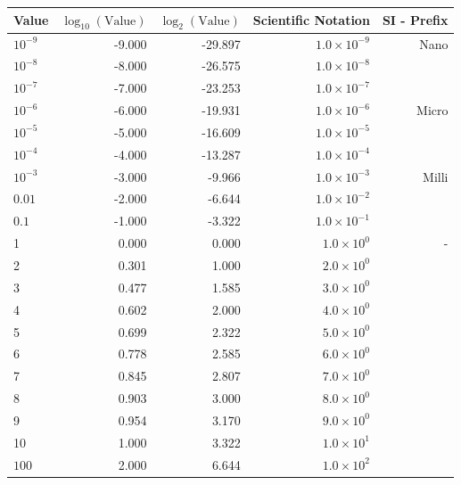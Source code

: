 \documentclass[12pt]{article}
\begin{document}
\begin{table}[h]
    \centering
    \renewcommand{\arraystretch}{1.2}
    \begin{tabular}{|l|r|r|r|r|}
        \hline
        \textbf{Value} & \(\log_{10}(\text{Value})\) & \(\log_{2}(\text{Value})\) & Scientific Notation & SI - Prefix \\
        \hline
        \(10^{-9}\)   & -9.000  & -29.897 & \(1.0 \times 10^{-9}\) & Nano \\
        \(10^{-8}\)   & -8.000  & -26.575 & \(1.0 \times 10^{-8}\) & \\
        \(10^{-7}\)   & -7.000  & -23.253 & \(1.0 \times 10^{-7}\) & \\
        \(10^{-6}\)   & -6.000  & -19.931 & \(1.0 \times 10^{-6}\) & Micro \\
        \(10^{-5}\)   & -5.000  & -16.609 & \(1.0 \times 10^{-5}\) & \\
        \(10^{-4}\)   & -4.000  & -13.287 & \(1.0 \times 10^{-4}\) & \\
        \(10^{-3}\)   & -3.000  & -9.966  & \(1.0 \times 10^{-3}\) & Milli \\
        \(0.01\)   & -2.000  & -6.644  & \(1.0 \times 10^{-2}\) & \\
        \(0.1\)   & -1.000  & -3.322  & \(1.0 \times 10^{-1}\) & \\
        \hline
        1             & 0.000   & 0.000   & \(1.0 \times 10^{0}\) & - \\
        2             & 0.301   & 1.000   & \(2.0 \times 10^{0}\) & \\
        3             & 0.477   & 1.585   & \(3.0 \times 10^{0}\) & \\
        4             & 0.602   & 2.000   & \(4.0 \times 10^{0}\) & \\
        5             & 0.699   & 2.322   & \(5.0 \times 10^{0}\) & \\
        6             & 0.778   & 2.585   & \(6.0 \times 10^{0}\) & \\
        7             & 0.845   & 2.807   & \(7.0 \times 10^{0}\) & \\
        8             & 0.903   & 3.000   & \(8.0 \times 10^{0}\) & \\
        9             & 0.954   & 3.170   & \(9.0 \times 10^{0}\) & \\
        10            & 1.000   & 3.322   & \(1.0 \times 10^{1}\) & \\
        \hline
        \(100\)      & 2.000   & 6.644   & \(1.0 \times 10^{2}\) & \\

\end{tabular}
\end{table}
\end{document}
